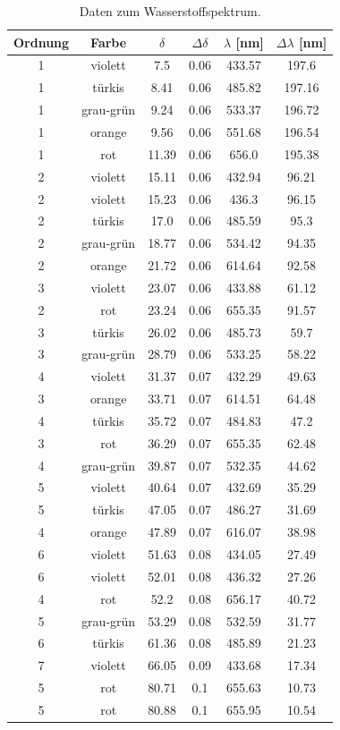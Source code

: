 \documentclass[]{article}
\begin{document}
\begin{table}[H]
\centering
\begin{tabular}{|c|c|c|c|c|c|}
\hline
Ordnung & Farbe & $\delta$ & $\Delta\delta$ & $\lambda$ [nm] & $\Delta\lambda$ [nm] \\ \hline\hline
1 & violett & 7.5 & 0.06 & 433.57 & 197.6 \\ \hline
1 & türkis & 8.41 & 0.06 & 485.82 & 197.16 \\ \hline
1 & grau-grün & 9.24 & 0.06 & 533.37 & 196.72 \\ \hline
1 & orange & 9.56 & 0.06 & 551.68 & 196.54 \\ \hline
1 & rot & 11.39 & 0.06 & 656.0 & 195.38 \\ \hline
2 & violett & 15.11 & 0.06 & 432.94 & 96.21 \\ \hline
2 & violett & 15.23 & 0.06 & 436.3 & 96.15 \\ \hline
2 & türkis & 17.0 & 0.06 & 485.59 & 95.3 \\ \hline
2 & grau-grün & 18.77 & 0.06 & 534.42 & 94.35 \\ \hline
2 & orange & 21.72 & 0.06 & 614.64 & 92.58 \\ \hline
3 & violett & 23.07 & 0.06 & 433.88 & 61.12 \\ \hline
2 & rot & 23.24 & 0.06 & 655.35 & 91.57 \\ \hline
3 & türkis & 26.02 & 0.06 & 485.73 & 59.7 \\ \hline
3 & grau-grün & 28.79 & 0.06 & 533.25 & 58.22 \\ \hline
4 & violett & 31.37 & 0.07 & 432.29 & 49.63 \\ \hline
3 & orange & 33.71 & 0.07 & 614.51 & 64.48 \\ \hline
4 & türkis & 35.72 & 0.07 & 484.83 & 47.2 \\ \hline
3 & rot & 36.29 & 0.07 & 655.35 & 62.48 \\ \hline
4 & grau-grün & 39.87 & 0.07 & 532.35 & 44.62 \\ \hline
5 & violett & 40.64 & 0.07 & 432.69 & 35.29 \\ \hline
5 & türkis & 47.05 & 0.07 & 486.27 & 31.69 \\ \hline
4 & orange & 47.89 & 0.07 & 616.07 & 38.98 \\ \hline
6 & violett & 51.63 & 0.08 & 434.05 & 27.49 \\ \hline
6 & violett & 52.01 & 0.08 & 436.32 & 27.26 \\ \hline
4 & rot & 52.2 & 0.08 & 656.17 & 40.72 \\ \hline
5 & grau-grün & 53.29 & 0.08 & 532.59 & 31.77 \\ \hline
6 & türkis & 61.36 & 0.08 & 485.89 & 21.23 \\ \hline
7 & violett & 66.05 & 0.09 & 433.68 & 17.34 \\ \hline
5 & rot & 80.71 & 0.1 & 655.63 & 10.73 \\ \hline
5 & rot & 80.88 & 0.1 & 655.95 & 10.54 \\ \hline
\hline
\end{tabular}
\caption{Daten zum Wasserstoffspektrum.\label{H Data}}
\end{table}
\end{document}
